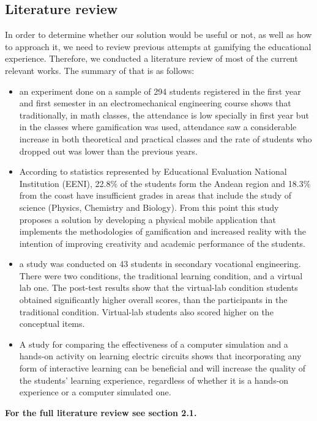 \documentclass[twoside,a4paper,11pt]{article}
\begin{document}
\begin{multicols}{2}
\subsection{Literature review}
In order to determine whether our solution would be useful or not, as well as how to approach it, we need to review previous attempts at gamifying the educational experience. Therefore, we conducted a literature review of most of the current relevant works. The summary of that is as follows: \\
\begin{itemize}
    \item an experiment done on a sample of 294 students registered in the first year and first semester in an electromechanical engineering course shows that traditionally, in math classes, the attendance
    is low specially in first year but in the classes where gamification was used, attendance saw a considerable increase in both theoretical and practical classes and the rate of students who dropped out was lower than
    the previous years. \cite{26}
    \item According to statistics represented by Educational Evaluation National Institution (EENI), 22.8\% of the students form the Andean region and 18.3\% from the coast have insufficient grades in areas that include the study of science (Physics, Chemistry and Biology). From this point
    this study proposes a solution by developing a physical mobile application that implements the methodologies of gamification and increased reality with the intention of improving creativity and
    academic performance of the students. \cite{27}
    \item a study was conducted on 43 students in secondary vocational engineering. There were two conditions, the traditional
    learning condition, and a virtual lab one. The post-test results show that the virtual-lab condition students obtained significantly higher overall
    scores, than the participants in the traditional condition. Virtual-lab students also scored higher on the conceptual items. \cite{25}
    \item A study for comparing the effectiveness of a computer simulation
    and a hands-on activity on learning electric circuits shows that incorporating any form of interactive learning can be beneficial
    and will increase the quality of the students’ learning experience, regardless of whether it is a hands-on experience or a computer simulated one. \cite{24}
\end{itemize}
\textbf{For the full literature review see \cite{29} section 2.1.}

\end{multicols}
\end{document}
